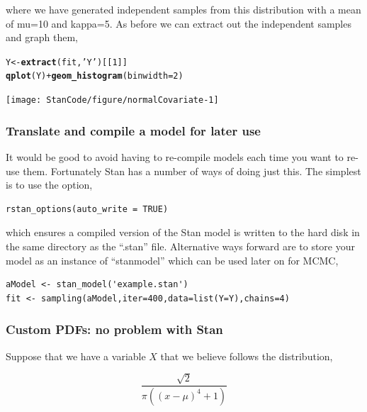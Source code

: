 \documentclass[11pt,fullpage]{book}
\makeatletter
\newenvironment{kframe}{%
	\def\at@end@of@kframe{}%
	\ifinner\ifhmode%
	\def\at@end@of@kframe{\end{minipage}}%
\begin{minipage}{\columnwidth}%
	\fi\fi%
	\def\FrameCommand##1{\hskip\@totalleftmargin \hskip-\fboxsep
		\colorbox{shadecolor}{##1}\hskip-\fboxsep
		\hskip-\linewidth \hskip-\@totalleftmargin \hskip\columnwidth}%
	\MakeFramed {\advance\hsize-\width
		\@totalleftmargin\z@ \linewidth\hsize
		\@setminipage}}%
{\par\unskip\endMakeFramed%
	\at@end@of@kframe}
\newcommand{\hlnum}[1]{\textcolor[rgb]{0.686,0.059,0.569}{#1}}%
\newcommand{\hlstr}[1]{\textcolor[rgb]{0.192,0.494,0.8}{#1}}%
\newcommand{\hlopt}[1]{\textcolor[rgb]{0,0,0}{#1}}%
\newcommand{\hlstd}[1]{\textcolor[rgb]{0.345,0.345,0.345}{#1}}%
\newcommand{\hlkwb}[1]{\textcolor[rgb]{0.69,0.353,0.396}{#1}}%
\newcommand{\hlkwc}[1]{\textcolor[rgb]{0.333,0.667,0.333}{#1}}%
\newcommand{\hlkwd}[1]{\textcolor[rgb]{0.737,0.353,0.396}{\textbf{#1}}}%
\newenvironment{knitrout}{}{} %
\makeatother
\begin{document}
where we have generated independent samples from this distribution with a mean of mu=10 and kappa=5. As before we can extract out the independent samples and graph them,

\begin{knitrout}\small
		\color{fgcolor}\begin{kframe}
\begin{alltt}
\hlstd{Y} \hlkwb{<-} \hlkwd{extract}\hlstd{(fit,}\hlstr{'Y'}\hlstd{)[[}\hlnum{1}\hlstd{]]}
\hlkwd{qplot}\hlstd{(Y)} \hlopt{+} \hlkwd{geom_histogram}\hlstd{(}\hlkwc{binwidth} \hlstd{=} \hlnum{2}\hlstd{)}
\end{alltt}


{\ttfamily\noindent\itshape\color{messagecolor}{\#\# `stat\_bin()` using `bins = 30`. Pick better value with `binwidth`.}}\end{kframe}
\texttt{[image: StanCode/figure/normalCovariate-1]} 
	\end{knitrout}

\subsubsection{Translate and compile a model for later use}
It would be good to avoid having to re-compile models each time you want to re-use them. Fortunately Stan has a number of ways of doing just this. The simplest is to use the option,

\begin{verbatim}
rstan_options(auto_write = TRUE)
\end{verbatim}

which ensures a compiled version of the Stan model is written to the hard disk in the same directory as the ``.stan'' file. Alternative ways forward are to store your model as an instance of ``stanmodel'' which can be used later on for MCMC,

\begin{verbatim}
aModel <- stan_model('example.stan')
fit <- sampling(aModel,iter=400,data=list(Y=Y),chains=4)
\end{verbatim}

\subsubsection{Custom PDFs: no problem with Stan}\label{sec:StanJags_customPDF}
Suppose that we have a variable $X$ that we believe follows the distribution,

\begin{equation}
\frac{\sqrt{2}}{\pi  \left((x-\mu )^4+1\right)}
\end{equation}
\end{document}
